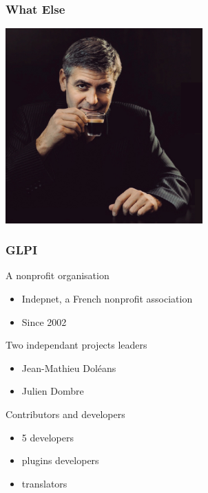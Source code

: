 \documentclass{beamer}
\begin{document}
\begin{frame}

    \frametitle{What Else}


\includegraphics[height=7.5cm]{./pics/whatelse.jpg}

\end{frame}

\begin{frame}

    \frametitle{GLPI}

    \begin{block}{A nonprofit organisation}
        \begin{itemize}
            \item Indepnet, a French nonprofit association
            \item Since 2002
        \end{itemize}
    \end{block}

    \begin{block}{Two independant projects leaders}
        \begin{itemize}
            \item Jean-Mathieu Doléans
            \item Julien Dombre
        \end{itemize}
    \end{block}

    \begin{block}{Contributors and developers}
        \begin{itemize}
            \item 5 developers
            \item plugins developers
            \item translators
        \end{itemize}
    \end{block}

\end{frame}
\end{document}
